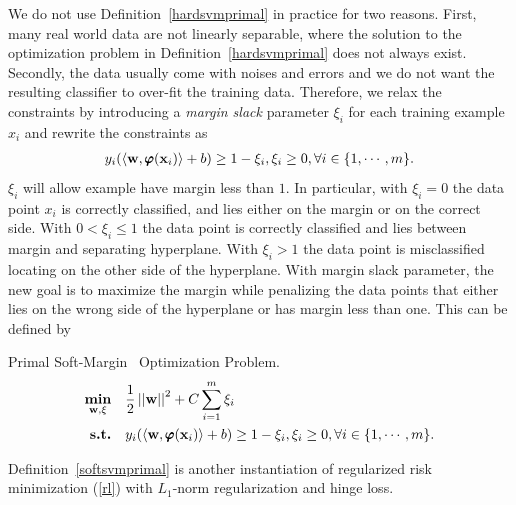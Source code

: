 {%
We do not use Definition~\ref{hardsvmprimal} in practice for two reasons. 
First, many real world data are not linearly separable, where the solution to the optimization problem in Definition~\ref{hardsvmprimal} does not always exist.
Secondly, the data usually come with noises and errors and we do not want the resulting classifier to over-fit the training data.
Therefore, we relax the constraints by introducing a \textit{margin slack} parameter $\xi_i$ for each training example $x_i$ and rewrite the constraints as 
\begin{align}
	y_i(\langle \mathbf {w}, \pmb \varphi(\mathbf {x}_i) \rangle + b) \ge 1-\xi_i, \xi_i\ge 0, \forall i\in\{1,\cdots,m\}. \label{softsvmconstraint}
\end{align}
$\xi_i$ will allow example have margin less than $1$.
In particular, with $\xi_i=0$ the data point $x_i$ is correctly classified, and lies either on the margin or on the correct side.
With $0<\xi_i\le 1$ the data point is correctly classified and lies between margin and separating hyperplane.
With $\xi_i>1$ the data point is misclassified locating on the other side of the hyperplane.
With margin slack parameter, the new goal is to maximize the margin while penalizing the data points that either lies on the wrong side of the hyperplane or has margin less than one.
This can be defined by
\begin{definition}{Primal Soft-Margin \svm\ Optimization Problem.}\label{softsvmprimal}
	\begin{align*}
		\underset{\mathbf {w},\xi}{\textbf{min}} & \quad\frac{1}{2}\left|\left| \mathbf {w} \right|\right|^2 + C\sum_{i=1}^{m}\xi_i\\
		\textbf{s.t.} & \quad y_i(\langle \mathbf {w}, \pmb \varphi(\mathbf {x}_i) \rangle + b) \ge 1-\xi_i, \xi_i\ge 0, \forall i\in\{1,\cdots,m\}.
	\end{align*}
\end{definition}
Definition~\ref{softsvmprimal} is another instantiation of regularized risk minimization (\ref{rl}) with $L_1$-norm regularization and hinge loss.

}
